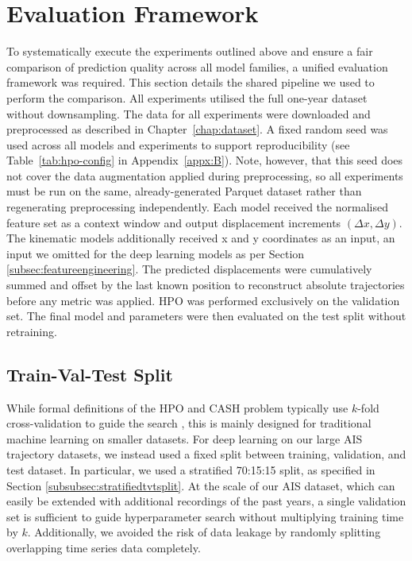 \section{Evaluation Framework}%
\label{sec:evaluationframework}
To systematically execute the experiments outlined above and ensure a fair comparison of prediction quality across all model families, a unified evaluation framework was required.
This section details the shared pipeline we used to perform the comparison.
All experiments utilised the full one-year dataset without downsampling. The data for all experiments were downloaded and preprocessed as described in Chapter~\ref{chap:dataset}.
A fixed random seed was used across all models and experiments to support reproducibility (see Table~\ref{tab:hpo-config} in Appendix~\ref{appx:B}). Note, however, that this seed does not cover the  data augmentation applied during preprocessing, so all experiments must be run on the same, already-generated Parquet dataset rather than regenerating preprocessing independently.
 Each model received the  normalised feature set 
    as a context window and output displacement increments $(\Delta x, \Delta y)$. The kinematic models additionally received x and y coordinates as an input, an input we omitted for the deep learning models as per Section \ref{subsec:featureengineering}. %
    The predicted displacements were cumulatively summed and offset by the last known position to reconstruct absolute trajectories before any metric was applied. 
     \ac{HPO} was performed exclusively on the validation set. The final model and parameters were then evaluated on the test split without retraining.
    

      \subsection{Train-Val-Test Split}
            While formal definitions of the \ac{HPO} and \ac{CASH} problem typically use $k$-fold cross-validation to guide the search \parencite{AutoMLHoos, Feurer2015}, this is mainly designed for traditional machine learning on smaller datasets. For deep learning on our large \ac{AIS} trajectory datasets, we instead used a fixed split between training, validation, and test dataset. In particular, we used a stratified 70:15:15 split, as specified in Section \ref{subsubsec:stratifiedtvtsplit}.  %
            At the scale of our \ac{AIS} dataset, which can easily be extended with additional recordings of the past years, a single validation set is sufficient to guide hyperparameter search without multiplying training time by $k$. 
            Additionally, we avoided the risk of data leakage by randomly splitting overlapping time series data completely.
            
